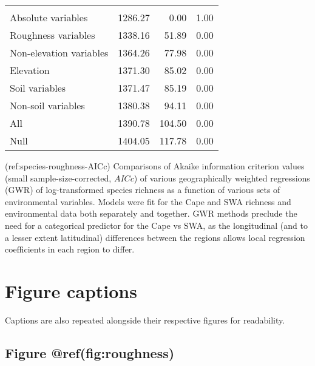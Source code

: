 \begin{table}[!h]
\begin{tabular}[t]{lrrr}
\addlinespace[0.3em]
\multicolumn{4}{l}{\textbf{Both:}}\\
\hspace{1em}Absolute variables & 1286.27 & 0.00 & 1.00\\
\hspace{1em}Roughness variables & 1338.16 & 51.89 & 0.00\\
\hspace{1em}Non-elevation variables & 1364.26 & 77.98 & 0.00\\
\hspace{1em}Elevation & 1371.30 & 85.02 & 0.00\\
\hspace{1em}Soil variables & 1371.47 & 85.19 & 0.00\\
\hspace{1em}Non-soil variables & 1380.38 & 94.11 & 0.00\\
\hspace{1em}All & 1390.78 & 104.50 & 0.00\\
\hspace{1em}Null & 1404.05 & 117.78 & 0.00\\
\bottomrule
\end{tabular}
\end{table}

(ref:species-roughness-AICc) Comparisons of Akaike information criterion
values (small sample-size-corrected, \(AICc\)) of various geographically
weighted regressions (GWR) of log-transformed species richness as a
function of various sets of environmental variables. Models were fit for
the Cape and SWA richness and environmental data both separately and
together. GWR methods preclude the need for a categorical predictor for
the Cape vs SWA, as the longitudinal (and to a lesser extent
latitudinal) differences between the regions allows local regression
coefficients in each region to differ.

\break

\hypertarget{figure-captions}{%
\section*{Figure captions}\label{figure-captions}}

Captions are also repeated alongside their respective figures for
readability.

\hypertarget{figure-reffigroughness}{%
\subsection*{Figure @ref(fig:roughness)}\label{figure-reffigroughness}}

